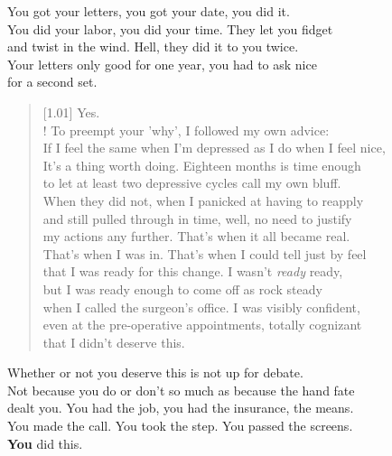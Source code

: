 \begin{ally}
  You got your letters, you got your date, you did it.\\
  \noindent You did your labor, you did your time. They let you fidget\\
  \noindent and twist in the wind. Hell, they did it to you twice.\\
  \noindent Your letters only good for one year, you had to ask nice\\
  \noindent for a second set.
\end{ally}

\begin{verse}[1.01\textwidth]
  Yes.\\!
   To preempt your 'why', I followed my own advice:\\
  If I feel the same when I'm depressed as I do when I feel nice,\\
  It's a thing worth doing. Eighteen months is time enough\\
  to let at least two depressive cycles call my own bluff.\\
  When they did not, when I panicked at having to reapply\\
  and still pulled through in time, well, no need to justify\\
  my actions any further. That's when it all became real.\\
  That's when I was in. That's when I could tell just by feel\\
  that I was ready for this change. I wasn't \emph{ready} ready,\\
  but I was ready enough to come off as rock steady\\
  when I called the surgeon's office. I was visibly confident,\\
  even at the pre-operative appointments, totally cognizant\\
  that I didn't deserve this.
\end{verse}

\begin{ally}
  Whether or not you deserve this is not up for debate.\\
  \noindent Not because you do or don't so much as because the hand fate\\
  \noindent dealt you. You had the job, you had the insurance, the means.\\
  \noindent You made the call. You took the step. You passed the screens.\\
  \noindent \textbf{You} did this.
\end{ally}
\newpage
